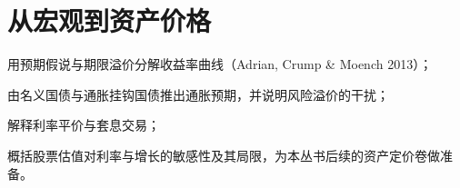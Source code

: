 \chapter{从宏观到资产价格}\label{ch:assetprices}

\begin{chapterguide}
\begin{guidegoals}
\item 用预期假说与期限溢价分解收益率曲线（Adrian, Crump \& Moench 2013）；
\item 由名义国债与通胀挂钩国债推出通胀预期，并说明风险溢价的干扰；
\item 解释利率平价与套息交易；
\item 概括股票估值对利率与增长的敏感性及其局限，为本丛书后续的资产定价卷做准备。
\end{guidegoals}
\end{chapterguide}

\chapterstub
